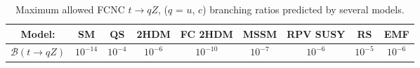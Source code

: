 \begin{table}[h]
	\begin{adjustbox}{max width=1.\textwidth,center}
		\begin{tabular}{ccccccccc}
			\hline 
			Model:&  			                         SM&  				   QS&  			   2HDM&  				FC 2HDM				& MSSM 			&  RPV SUSY			&  			RS				& EMF \\ 
			\hline 
			$\mathcal{B}(t\rightarrow qZ)$ & $10^{-14}$     & $10^{-4}$ &  $10^{-6}$          & $10^{-10}$  & $10^{-7}$      &$10^{-6}$            & $10^{-5}$           & $10^{-6}$  \\ 
			\hline 
		\end{tabular} 
	\end{adjustbox}
\caption{Maximum allowed FCNC $t\rightarrow qZ$, ($q$ = $u$, $c$) branching ratios predicted by several models\cite{tcZ_sm,qs_limit,h2dm_limit,mssm_limit,RPV_limit,extra_limit,rs_limit,report_limit}.}
\label{tab:expBR}
\end{table} 


